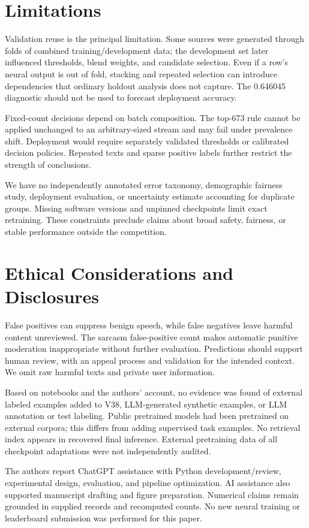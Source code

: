 \documentclass[10pt,a4paper]{article}
\begin{document}
\section{Limitations}
Validation reuse is the principal limitation. Some sources were generated through folds of combined training/development data; the development set later influenced thresholds, blend weights, and candidate selection. Even if a row's neural output is out of fold, stacking and repeated selection can introduce dependencies that ordinary holdout analysis does not capture. The 0.646045 diagnostic should not be used to forecast deployment accuracy.

Fixed-count decisions depend on batch composition. The top-673 rule cannot be applied unchanged to an arbitrary-sized stream and may fail under prevalence shift. Deployment would require separately validated thresholds or calibrated decision policies. Repeated texts and sparse positive labels further restrict the strength of conclusions.

We have no independently annotated error taxonomy, demographic fairness study, deployment evaluation, or uncertainty estimate accounting for duplicate groups. Missing software versions and unpinned checkpoints limit exact retraining. These constraints preclude claims about broad safety, fairness, or stable performance outside the competition.

\section{Ethical Considerations and Disclosures}
False positives can suppress benign speech, while false negatives leave harmful content unreviewed. The sarcasm false-positive count makes automatic punitive moderation inappropriate without further evaluation. Predictions should support human review, with an appeal process and validation for the intended context. We omit raw harmful texts and private user information.

Based on notebooks and the authors' account, no evidence was found of external labeled examples added to V38, LLM-generated synthetic examples, or LLM annotation or test labeling. Public pretrained models had been pretrained on external corpora; this differs from adding supervised task examples. No retrieval index appears in recovered final inference. External pretraining data of all checkpoint adaptations were not independently audited.

The authors report ChatGPT assistance with Python development/review, experimental design, evaluation, and pipeline optimization. AI assistance also supported manuscript drafting and figure preparation. Numerical claims remain grounded in supplied records and recomputed counts. No new neural training or leaderboard submission was performed for this paper.
\end{document}
